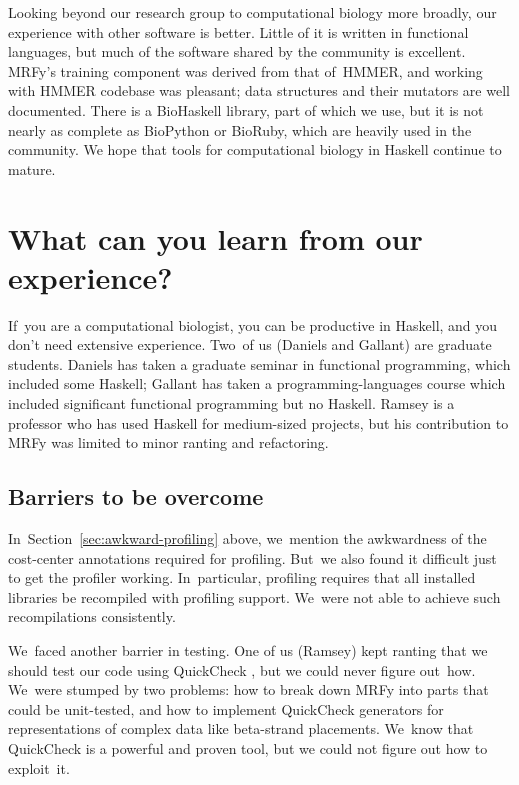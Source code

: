 \documentclass[preprint,nonatbib,blockstyle,nocopyrightspace,times]{sigplanconf}
\newcommand\secref[1]{Section~\ref{sec:#1}}
\let\cite\citep
\begin{document}
Looking beyond our research group to computational biology more
broadly, our experience with other software is better.
Little of it is written in functional languages, 
but much of the software shared by the community is excellent.
MRFy's training component was derived from that of~HMMER,
and
working with HMMER 
codebase was pleasant;
data structures and their
mutators are well documented. 
There is a 
BioHaskell library, part of which we use,
but it is not nearly as 
complete as BioPython or BioRuby, which are heavily used in the community.
We hope that tools for computational biology in
Haskell continue to mature. 

\section{What can you learn from our experience?}

If~you are a computational biologist, 
you can be productive in Haskell, and you don't need extensive
experience.
Two~of us (Daniels and Gallant) are graduate students.
Daniels has taken a graduate seminar in functional programming, which
included some Haskell;
Gallant has taken a programming-languages course which included
significant functional programming but no Haskell.
Ramsey is a professor who has used Haskell 
for medium-sized projects,
but his contribution to MRFy was limited to minor ranting and refactoring.


\subsection{Barriers to be overcome}

In~\secref{awkward-profiling} above, we~mention the awkwardness of the
cost-center annotations required for profiling.
But~we also found it difficult just to get the profiler working.
In~particular, profiling requires that all installed libraries be recompiled
with profiling support.
We~were not able to achieve such recompilations consistently.


We~faced another barrier in testing.
One of us (Ramsey) kept ranting that we should test our code using 
QuickCheck \cite{claessen:quickcheck},
but we could never figure out~how.
We~were stumped by two problems:
how to break down MRFy into parts that could be
unit-tested,
and how to implement QuickCheck generators for representations of complex
data like beta-strand placements.
We~know that QuickCheck is a powerful and proven tool,
but we could not figure out how to exploit~it.
\end{document}
